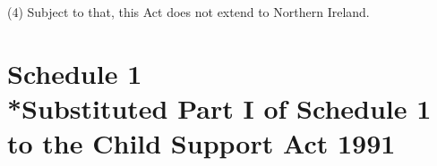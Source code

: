 \documentclass[12pt,a4paper]{article}
\begin{document}
(4) Subject to that, this Act does not extend to Northern Ireland.

\small

\part*{}

\part[Schedule 1 --- Substituted Part I of Schedule 1 to the Child Support Act 1991]{Schedule 1\\*Substituted Part I of Schedule 1 to the Child Support Act 1991}

\renewcommand\parthead{--- Schedule 1}

\end{document}
